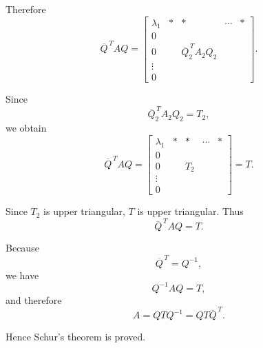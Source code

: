 \documentclass[12pt,a4paper]{article}
\begin{document}
Therefore
\[
    \overline{Q}^{\,T}AQ
    =
    \left[
        \begin{array}{ccccc}
            \lambda_1 & * & *                          & \cdots & * \\
            0         &   &                            &        &   \\
            0         &   & \overline{Q}_2^{\,T}A_2Q_2 &        &   \\
            \vdots    &   &                            &        &   \\
            0         &   &                            &        &
        \end{array}
        \right].
\]

Since
\[
    \overline{Q}_2^{\,T}A_2Q_2=T_2,
\]
we obtain
\[
    \boxed{
        \overline{Q}^{\,T}AQ
        =
        \left[
            \begin{array}{ccccc}
                \lambda_1 & * & *   & \cdots & * \\
                0         &   &     &        &   \\
                0         &   & T_2 &        &   \\
                \vdots    &   &     &        &   \\
                0         &   &     &        &
            \end{array}
            \right]
        =T.
    }
\]

Since $T_2$ is upper triangular, $T$ is upper triangular. Thus
\[
    \overline{Q}^{\,T}AQ=T.
\]

Because
\[
    \overline{Q}^{\,T}=Q^{-1},
\]
we have
\[
    Q^{-1}AQ=T,
\]
and therefore
\[
    \boxed{
        A=QTQ^{-1}=QT\overline{Q}^{\,T}.
    }
\]

Hence Schur's theorem is proved.
\end{document}
